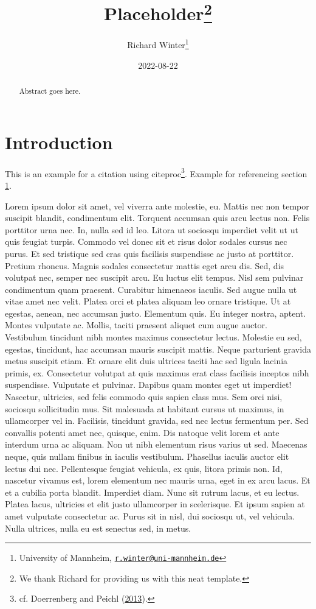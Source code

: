 \documentclass[
  12pt,
]{article}
\title{Placeholder\footnote{We thank Richard for providing us with this neat template.}}
\author{Richard Winter\footnote{University of Mannheim, \href{mailto:r.winter@uni-mannheim.de}{\nolinkurl{r.winter@uni-mannheim.de}}}}
\date{2022-08-22}
\begin{document}
\maketitle
\begin{abstract}
Abstract goes here.
\end{abstract}

\newpage

\hypertarget{intro}{%
\section{Introduction}\label{intro}}

This is an example for a citation using citeproc\footnote{cf. Doerrenberg and Peichl (\protect\hyperlink{ref-doerrenberg2013progressive}{2013}).}. Example for referencing section \ref{intro}.

Lorem ipsum dolor sit amet, vel viverra ante molestie, eu. Mattis nec non tempor suscipit blandit, condimentum elit. Torquent accumsan quis arcu lectus non. Felis porttitor urna nec. In, nulla sed id leo. Litora ut sociosqu imperdiet velit ut ut quis feugiat turpis. Commodo vel donec sit et risus dolor sodales cursus nec purus. Et sed tristique sed cras quis facilisis suspendisse ac justo at porttitor. Pretium rhoncus. Magnis sodales consectetur mattis eget arcu dis. Sed, dis volutpat nec, semper nec suscipit arcu. Eu luctus elit tempus. Nisl sem pulvinar condimentum quam praesent. Curabitur himenaeos iaculis. Sed augue nulla ut vitae amet nec velit. Platea orci et platea aliquam leo ornare tristique. Ut at egestas, aenean, nec accumsan justo. Elementum quis. Eu integer nostra, aptent. Montes vulputate ac. Mollis, taciti praesent aliquet cum augue auctor. Vestibulum tincidunt nibh montes maximus consectetur lectus. Molestie eu sed, egestas, tincidunt, hac accumsan mauris suscipit mattis. Neque parturient gravida metus suscipit etiam. Et ornare elit duis ultrices taciti hac sed ligula lacinia primis, ex. Consectetur volutpat at quis maximus erat class facilisis inceptos nibh suspendisse. Vulputate et pulvinar. Dapibus quam montes eget ut imperdiet! Nascetur, ultricies, sed felis commodo quis sapien class mus. Sem orci nisi, sociosqu sollicitudin mus. Sit malesuada at habitant cursus ut maximus, in ullamcorper vel in. Facilisis, tincidunt gravida, sed nec lectus fermentum per. Sed convallis potenti amet nec, quisque, enim. Dis natoque velit lorem et ante interdum urna ac aliquam. Non ut nibh elementum risus varius ut sed. Maecenas neque, quis nullam finibus in iaculis vestibulum. Phasellus iaculis auctor elit lectus dui nec. Pellentesque feugiat vehicula, ex quis, litora primis non. Id, nascetur vivamus est, lorem elementum nec mauris urna, eget in ex arcu lacus. Et et a cubilia porta blandit. Imperdiet diam. Nunc sit rutrum lacus, et eu lectus. Platea lacus, ultricies et elit justo ullamcorper in scelerisque. Et ipsum sapien at amet vulputate consectetur ac. Purus sit in nisl, dui sociosqu ut, vel vehicula. Nulla ultrices, nulla eu est senectus sed, in metus.
\end{document}
